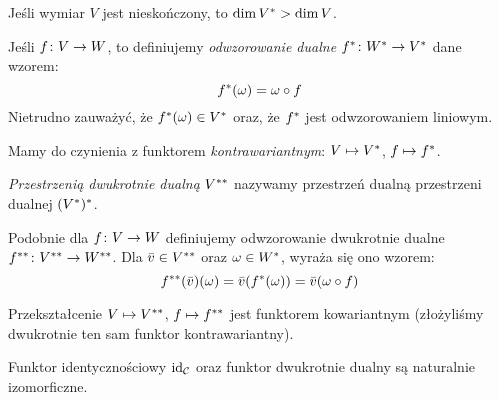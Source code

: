 {\begin{remk}
  Jeśli wymiar $V$ jest nieskończony, to $\dim {V}^{*} > \dim V$.
\end{remk}

\begin{defn}
  Jeśli $f\colon V\to W$, to definiujemy \emph{odwzorowanie dualne} ${f}^{*}\colon {W}^{*}\to {V}^{*}$ dane wzorem:
  $${f}^{*}(\omega) = \omega \circ f$$
  Nietrudno zauważyć, że ${f}^{*}(\omega)\in {V}^{*}$ oraz, że ${f}^{*}$ jest odwzorowaniem liniowym.
\end{defn}

\begin{remk}
  Mamy do czynienia z funktorem \emph{kontrawariantnym}: $V\mapsto {V}^{*}$, $f\mapsto {f}^{*}$.
\end{remk}

\begin{defn}
  \emph{Przestrzenią dwukrotnie dualną} ${V}^{**}$ nazywamy przestrzeń dualną przestrzeni dualnej $({V}^{*})^*$.

  Podobnie dla $f\colon V\to W$ definiujemy odwzorowanie dwukrotnie dualne ${f}^{**}\colon {V}^{**}\to {W}^{**}$. Dla $\bar v\in {V}^{**}$ oraz $\omega \in {W}^{*}$, wyraża się ono wzorem:
    $${f}^{**}(\bar v)(\omega) = \bar v({f}^{*}(\omega)) = \bar v(\omega\circ f)$$
\end{defn}

\begin{cor}
  Przekształcenie $V\mapsto {V}^{**}$, $f\mapsto {f}^{**}$ jest funktorem kowariantnym (złożyliśmy dwukrotnie ten sam funktor kontrawariantny).
\end{cor}

\begin{thm}
  Funktor identycznościowy $\mathrm{id}_{\mathcal C}$ oraz funktor dwukrotnie dualny są naturalnie izomorficzne.
\end{thm}

}

